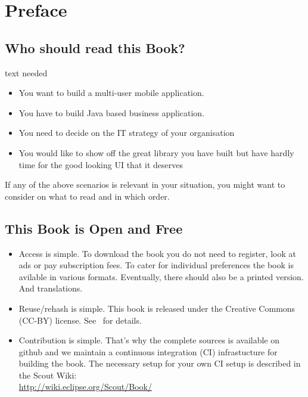 \documentclass[a4paper,10pt,twoside]{book}
\begin{document}
  \sloppy
\fi


\chapter{Preface}


\section*{Who should read this Book?}

text needed

\begin{itemize}
\item You want to build a multi-user mobile application.
\item You have to build Java based business application. 
\item You need to decide on the IT strategy of your organisation
\item You would like to show off the great library you have built but have hardly time for the good looking UI that it deserves
\end{itemize}

If any of the above scenarios is relevant in your situation, you might want
to consider  on what to read and in which order.

\section*{This Book is Open and Free}

\begin{itemize}
\item Access is simple. To download the book you do not need to register, 
look at ads or pay subscription fees. To cater for individual
preferences the book is avilable in various formats. 
Eventually, there should also be a printed version. And translations.

\item Reuse/rehash is simple. This book is released under the Creative Commons (CC-BY)
license. See~ for details.

\item Contribution is simple. That's why the complete sources is available on github
and we maintain a continuous integration (CI) infrastucture for building the book. 
The necessary setup for your own CI setup is described in the Scout Wiki: \\
\url{http://wiki.eclipse.org/Scout/Book/}
\end{itemize}
\end{document}
